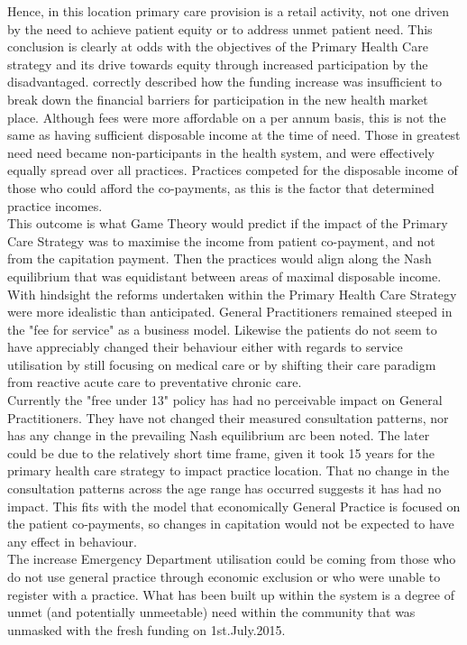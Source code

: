 \documentclass[11pt,a4paper]{article}
\begin{document}
Hence, in this location primary care provision is a retail activity, not one driven by the need to achieve patient equity or to address unmet patient need. This conclusion is clearly at odds with the objectives of the Primary Health Care strategy and its drive towards equity through increased participation by the disadvantaged. \citet{cumming2008reforming} correctly described how the funding increase was insufficient to break down the financial barriers for participation in the new health market place. Although fees were more affordable on a per annum basis, this is not the same as having sufficient disposable income at the time of need. Those in greatest need need became non-participants in the health system, and were effectively equally spread over all practices. Practices competed for the disposable income of those who could afford the co-payments, as this is the factor that determined practice incomes.\\

This outcome is what Game Theory would predict if the impact of the Primary Care Strategy was to maximise the income from patient co-payment, and not from the capitation payment. Then the practices would align along the Nash equilibrium that was equidistant between areas of maximal disposable income. With hindsight the reforms undertaken within the Primary Health Care Strategy were more idealistic than anticipated. General Practitioners remained steeped in the "fee for service" as a business model. Likewise the patients do not seem to have appreciably changed their behaviour either with regards to service utilisation by still focusing on medical care or by shifting their care paradigm from reactive acute care to preventative chronic care. \\

Currently the "free under 13" policy has had no perceivable impact on General Practitioners. They have not changed their measured consultation patterns, nor has any change in the prevailing Nash equilibrium arc been noted. The later could be due to the relatively short time frame, given it took 15 years for the primary health care strategy to impact practice location. That no change in the consultation patterns across the age range has occurred suggests it has had no impact. This fits with the model that economically General Practice is focused on the patient co-payments, so changes in capitation would not be expected to have any effect in behaviour.\\

The increase Emergency Department utilisation could be coming from those who do not use general practice through economic exclusion or who were unable to register with a practice. What has been built up within the system is a degree of unmet (and potentially unmeetable) need within the community that was unmasked with the fresh funding on 1st.July.2015.\\
\end{document}
